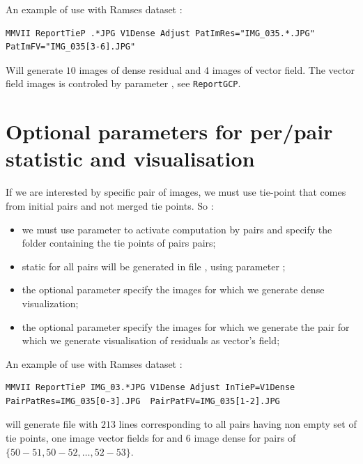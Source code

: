 \documentclass[a4paper]{article}
\begin{document}
An example of use with Ramses dataset :

\begin{verbatim}
MMVII ReportTieP .*JPG V1Dense Adjust PatImRes="IMG_035.*.JPG"  PatImFV="IMG_035[3-6].JPG"
\end{verbatim}

Will generate $10$ images of dense residual and $4$ images of vector field. The vector field
images is controled by parameter  , see {\tt ReportGCP}.


\section{Optional parameters  for  per/pair statistic and visualisation}

If we are interested by specific pair of images, we must use tie-point that comes
from initial pairs and not merged tie points. So : 

\begin{itemize}
    \item we must use parameter   to activate computation by pairs and specify the folder containing the 
          tie points of pairs pairs;

    \item static for all pairs will be generated in file   , using 
          parameter  ;

    \item the optional parameter  specify the images for which we generate 
          dense visualization;

    \item the optional parameter  specify the images for which we generate 
          the pair for  which we generate visualisation of residuals as vector's field;

\end{itemize}

An example of use with Ramses dataset :

\begin{verbatim}
MMVII ReportTieP IMG_03.*JPG V1Dense Adjust InTieP=V1Dense  PairPatRes=IMG_035[0-3].JPG  PairPatFV=IMG_035[1-2].JPG
\end{verbatim}

will generate  file  with $213$ lines corresponding to all pairs having non empty set of tie points,
one image vector fields for  and $6$ image dense
for pairs of  $\{50-51,50-52,\dots,52-53\}$.
\end{document}
